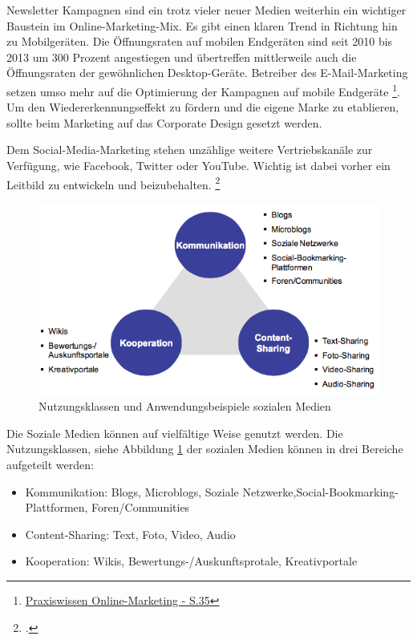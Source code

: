 Newsletter Kampagnen sind ein trotz vieler neuer Medien weiterhin ein wichtiger Baustein im Online-Marketing-Mix. Es gibt einen klaren Trend in Richtung hin zu Mobilgeräten. Die Öffnungsraten auf mobilen Endgeräten sind seit 2010 bis 2013 um 300 Prozent angestiegen und übertreffen mittlerweile auch die Öffnungsraten der gewöhnlichen Desktop-Geräte. Betreiber des E-Mail-Marketing setzen umso mehr auf die Optimierung der Kampagnen auf mobile Endgeräte \footnote{\url{Praxiswissen Online-Marketing - S.35}}. Um den Wiedererkennungseffekt zu fördern und die eigene Marke zu etablieren, sollte beim Marketing auf das Corporate Design gesetzt werden.

Dem Social-Media-Marketing stehen unzählige weitere Vertriebskanäle zur Verfügung, wie Facebook, 
Twitter oder YouTube. Wichtig ist dabei vorher ein Leitbild zu entwickeln und beizubehalten. 
\footcite[8]{hsmerseburg_masterkonzept_2009}

\begin{figure}[h!]
	\centering
	\includegraphics[width=\textwidth]{kapitel/gruppe1_2/bilder/nutzungsklassen}
	\caption{Nutzungsklassen und Anwendungsbeispiele sozialen Medien\protect\footnotemark}
	\label{fig_nutzungsklassen}
\end{figure}
\clearpage
Die Soziale Medien können auf vielfältige Weise genutzt werden. Die Nutzungsklassen, siehe Abbildung \ref{fig_nutzungsklassen} der sozialen Medien können in drei Bereiche aufgeteilt werden:


\begin{itemize}
	\item Kommunikation: Blogs, Microblogs, Soziale Netzwerke,\newline Social-Bookmarking-Plattformen, Foren/Communities
	\item Content-Sharing: Text, Foto, Video, Audio
	\item Kooperation: Wikis, Bewertungs-/Auskunftsprotale, Kreativportale
\end{itemize}

